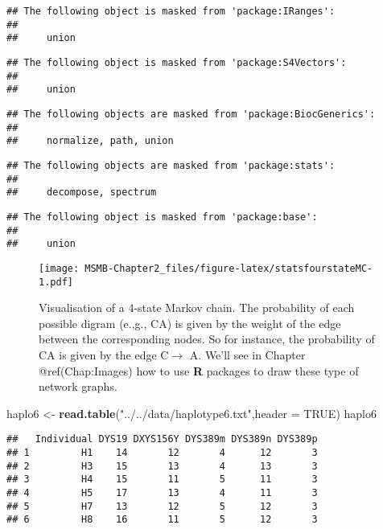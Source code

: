 \documentclass[]{article}
\newenvironment{Shaded}{\begin{snugshade}}{\end{snugshade}}
\newcommand{\KeywordTok}[1]{\textcolor[rgb]{0.13,0.29,0.53}{\textbf{#1}}}
\newcommand{\DataTypeTok}[1]{\textcolor[rgb]{0.13,0.29,0.53}{#1}}
\newcommand{\StringTok}[1]{\textcolor[rgb]{0.31,0.60,0.02}{#1}}
\newcommand{\OtherTok}[1]{\textcolor[rgb]{0.56,0.35,0.01}{#1}}
\newcommand{\NormalTok}[1]{#1}
\begin{document}
\begin{verbatim}
## The following object is masked from 'package:IRanges':
## 
##     union
\end{verbatim}

\begin{verbatim}
## The following object is masked from 'package:S4Vectors':
## 
##     union
\end{verbatim}

\begin{verbatim}
## The following objects are masked from 'package:BiocGenerics':
## 
##     normalize, path, union
\end{verbatim}

\begin{verbatim}
## The following objects are masked from 'package:stats':
## 
##     decompose, spectrum
\end{verbatim}

\begin{verbatim}
## The following object is masked from 'package:base':
## 
##     union
\end{verbatim}

\begin{figure}
\centering
\texttt{[image: MSMB-Chapter2\_files/figure-latex/statsfourstateMC-1.pdf]}
\caption{Visualisation of a 4-state Markov chain. The probability of
each possible digram (e.,g., CA) is given by the weight of the edge
between the corresponding nodes. So for instance, the probability of CA
is given by the edge C\(\to\) A. We'll see in Chapter @ref(Chap:Images)
how to use \textbf{R} packages to draw these type of network graphs.}
\end{figure}

\begin{Shaded}
\begin{Highlighting}[]
\NormalTok{haplo6 <-}\StringTok{ }\KeywordTok{read.table}\NormalTok{(}\StringTok{"../../data/haplotype6.txt"}\NormalTok{,}\DataTypeTok{header =} \OtherTok{TRUE}\NormalTok{)}
\NormalTok{haplo6}
\end{Highlighting}
\end{Shaded}

\begin{verbatim}
##   Individual DYS19 DXYS156Y DYS389m DYS389n DYS389p
## 1         H1    14       12       4      12       3
## 2         H3    15       13       4      13       3
## 3         H4    15       11       5      11       3
## 4         H5    17       13       4      11       3
## 5         H7    13       12       5      12       3
## 6         H8    16       11       5      12       3
\end{verbatim}
\end{document}
